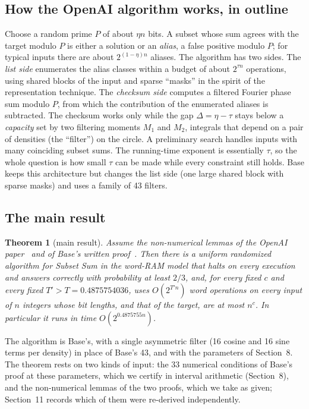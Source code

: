 \documentclass[11pt]{article}
\theoremstyle{plain}
\newtheorem{theorem}{Theorem}
\begin{document}
\subsection*{How the OpenAI algorithm works, in outline}
Choose a random prime $P$ of about $\eta n$ bits. A subset whose sum agrees with the target modulo $P$ is either a solution or an \emph{alias}, a false positive modulo $P$; for typical inputs there are about $2^{(1-\eta)n}$ aliases. The algorithm has two sides. The \emph{list side} enumerates the alias classes within a budget of about $2^{\tau n}$ operations, using shared blocks of the input and sparse ``masks'' in the spirit of the representation technique. The \emph{checksum side} computes a filtered Fourier phase sum modulo $P$, from which the contribution of the enumerated aliases is subtracted. The checksum works only while the gap $\Delta = \eta - \tau$ stays below a \emph{capacity} set by two filtering moments $M_1$ and $M_2$, integrals that depend on a pair of densities (the ``filter'') on the circle. A preliminary search handles inputs with many coinciding subset sums. The running-time exponent is essentially $\tau$, so the whole question is how small $\tau$ can be made while every constraint still holds. Base keeps this architecture but changes the list side (one large shared block with sparse masks) and uses a family of 43 filters.

\subsection*{The main result}
\begin{theorem}[main result]\label{thm:main}
Assume the non-numerical lemmas of the OpenAI paper~\cite{openai} and of Base's written proof~\cite{base}. Then there is a uniform randomized algorithm for Subset Sum in the word-RAM model that halts on every execution and answers correctly with probability at least $2/3$, and, for every fixed $c$ and every fixed $T' > T = 0.4875754036$, uses $O(2^{T'n})$ word operations on every input of $n$ integers whose bit lengths, and that of the target, are at most $n^c$. In particular it runs in time $O(2^{0.4875755n})$.
\end{theorem}
The algorithm is Base's, with a single asymmetric filter (16 cosine and 16 sine terms per density) in place of Base's 43, and with the parameters of Section~8. The theorem rests on two kinds of input: the 33 numerical conditions of Base's proof at these parameters, which we certify in interval arithmetic (Section~8), and the non-numerical lemmas of the two proofs, which we take as given; Section~11 records which of them were re-derived independently.
\end{document}
